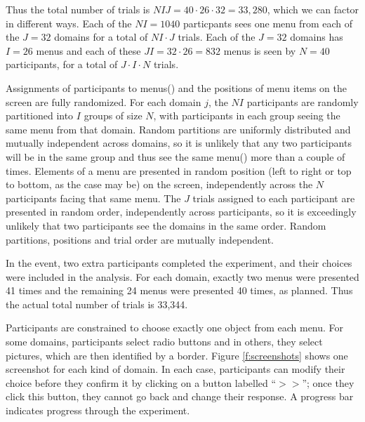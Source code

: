 \documentclass[11pt,letter]{article}
\newcommand{\menu}{menu}
\newcommand{\menus}{menus}
\begin{document}
Thus the total number of trials is $NIJ=40 \cdot 26 \cdot 32 = 33,280$, which we can factor in different ways.
Each of the $NI = 1040$ particpants sees one menu from each of the $J=32$ domains for a total of $NI \cdot J$ trials.
Each of the $J=32$ domains has $I=26$ menus and each of these $JI = 32\cdot 26 = 832$ \menus{} is seen by $N=40$ participants, for a total of $J\cdot I \cdot N$ trials.

Assignments of participants to \menus() and the positions of menu items on the screen are fully randomized.
For each domain $j$, the $NI$ participants are randomly partitioned into $I$ groups of size $N$, with participants in each group seeing the same \menu{} from that domain.
Random partitions are uniformly distributed and mutually independent across domains, so it is unlikely that any two participants will be in the same group and thus see the same \menu() more than a couple of times.
Elements of a \menu{} are presented in random position (left to right or top to bottom, as the case may be) on the screen, independently across the $N$ participants facing that same \menu{}.
The $J$ trials assigned to each participant are presented in random order, independently across participants, so it is exceedingly unlikely that two participants see the domains in the same order.
Random partitions, positions and trial order are mutually independent.

In the event, two extra participants completed the experiment, and their choices were included in the analysis.
For each domain, exactly two \menus{} were presented 41 times and the remaining 24 \menus{} were presented 40 times, as planned.
Thus the actual total number of trials is 33,344.

Participants are constrained to choose exactly one object from each \menu{}.
For some domains, participants select radio buttons and in others, they select pictures, which are then identified by a border.
Figure \ref{f:screenshots} shows one screenshot for each kind of domain.
In each case, participants can modify their choice before they confirm it by clicking on a button labelled ``$>>$''; once they click this button, they cannot go back and change their response.
A progress bar indicates progress through the experiment.
\end{document}
